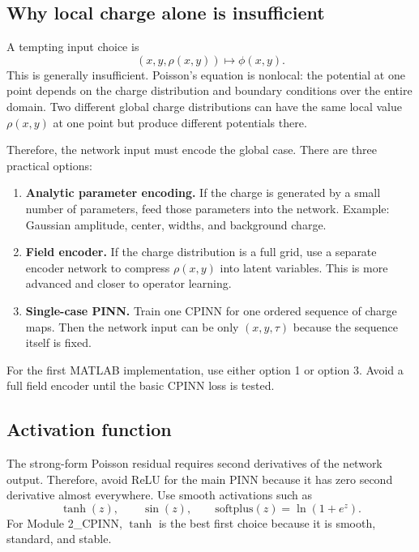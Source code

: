 \documentclass[11pt]{article}
\newcommand{\taud}{\tau}
\begin{document}
\subsection{Why local charge alone is insufficient}

A tempting input choice is
\begin{equation}
(x,y,\rho(x,y))\mapsto \phi(x,y).
\end{equation}
This is generally insufficient. Poisson's equation is nonlocal: the potential at one point depends on the charge distribution and boundary conditions over the entire domain. Two different global charge distributions can have the same local value $\rho(x,y)$ at one point but produce different potentials there.

Therefore, the network input must encode the global case. There are three practical options:
\begin{enumerate}[leftmargin=2em]
\item \textbf{Analytic parameter encoding.} If the charge is generated by a small number of parameters, feed those parameters into the network. Example: Gaussian amplitude, center, widths, and background charge.
\item \textbf{Field encoder.} If the charge distribution is a full grid, use a separate encoder network to compress $\rho(x,y)$ into latent variables. This is more advanced and closer to operator learning.
\item \textbf{Single-case PINN.} Train one CPINN for one ordered sequence of charge maps. Then the network input can be only $(x,y,\taud)$ because the sequence itself is fixed.
\end{enumerate}
For the first MATLAB implementation, use either option 1 or option 3. Avoid a full field encoder until the basic CPINN loss is tested.

\subsection{Activation function}

The strong-form Poisson residual requires second derivatives of the network output. Therefore, avoid ReLU for the main PINN because it has zero second derivative almost everywhere. Use smooth activations such as
\begin{equation}
\tanh(z),\qquad \sin(z),\qquad \mathrm{softplus}(z)=\ln(1+e^z).
\end{equation}
For Module 2\_CPINN, $\tanh$ is the best first choice because it is smooth, standard, and stable.
\end{document}
